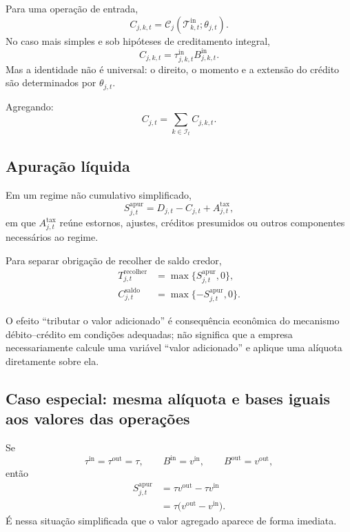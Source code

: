 \documentclass[11pt,a4paper]{article}
\newcommand{\cT}{\mathcal{T}}
\newcommand{\cC}{\mathcal{C}}
\begin{document}
Para uma operação de entrada,
\begin{equation}
\boxed{C_{j,k,t}=\cC_j(\cT^{\mathrm{in}}_{k,t};\theta_{j,t}).}
\label{eq:credit}
\end{equation}
No caso mais simples e sob hipóteses de creditamento integral,
\[
C_{j,k,t}=\tau_{j,k,t}^{\mathrm{in}}B_{j,k,t}^{\mathrm{in}}.
\]
Mas a identidade não é universal: o direito, o momento e a extensão do crédito são determinados por $\theta_{j,t}$.

Agregando:
\begin{equation}
\boxed{C_{j,t}=\sum_{k\in\mathcal I_t}C_{j,k,t}.}
\end{equation}

\subsection{Apuração líquida}

Em um regime não cumulativo simplificado,
\begin{equation}
\boxed{S_{j,t}^{\mathrm{apur}}=D_{j,t}-C_{j,t}+A_{j,t}^{\mathrm{tax}},}
\label{eq:saldo-tax}
\end{equation}
em que $A_{j,t}^{\mathrm{tax}}$ reúne estornos, ajustes, créditos presumidos ou outros componentes necessários ao regime.

Para separar obrigação de recolher de saldo credor,
\begin{align}
T_{j,t}^{\mathrm{recolher}}&=\max\{S_{j,t}^{\mathrm{apur}},0\},\\
C_{j,t}^{\mathrm{saldo}}&=\max\{-S_{j,t}^{\mathrm{apur}},0\}.
\end{align}

\begin{intuicao}
O efeito ``tributar o valor adicionado'' é consequência econômica do mecanismo débito--crédito em condições adequadas; não significa que a empresa necessariamente calcule uma variável ``valor adicionado'' e aplique uma alíquota diretamente sobre ela.
\end{intuicao}

\subsection{Caso especial: mesma alíquota e bases iguais aos valores das operações}

Se
\[
\tau^{\mathrm{in}}=\tau^{\mathrm{out}}=\tau,
\qquad
B^{\mathrm{in}}=v^{\mathrm{in}},
\qquad
B^{\mathrm{out}}=v^{\mathrm{out}},
\]
então
\begin{align}
S_{j,t}^{\mathrm{apur}}
&=\tau v^{\mathrm{out}}-\tau v^{\mathrm{in}}\\
&=\tau\bigl(v^{\mathrm{out}}-v^{\mathrm{in}}\bigr).
\end{align}
É nessa situação simplificada que o valor agregado aparece de forma imediata.
\end{document}
